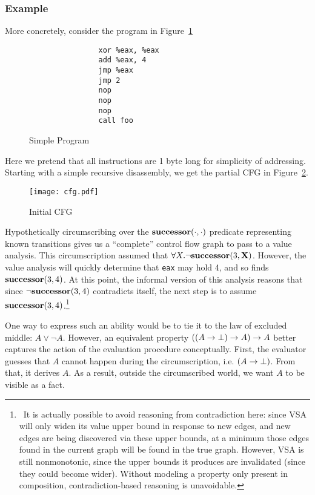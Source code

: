 \subsubsection{Example}
\label{sec:cfgexample}
More concretely, consider the program in Figure~\ref{fig:simpprog}
\begin{figure}
        \begin{lstlisting}
                xor %eax, %eax
                add %eax, 4
                jmp %eax
                jmp 2
                nop
                nop
                nop
                call foo
        \end{lstlisting}
        \caption{Simple Program}
\label{fig:simpprog}
\end{figure}
Here we pretend that all instructions are 1 byte long for simplicity of addressing.
Starting with a simple recursive disassembly, we get the partial CFG in Figure~\ref{fig:cfg0}.
\begin{figure}
        \begin{center}
                \texttt{[image: cfg.pdf]}
        \end{center}
        \caption{Initial CFG}
\label{fig:cfg0}
\end{figure}
Hypothetically circumscribing over the ${\bf successor}(\cdot, \cdot)$ predicate representing known transitions gives us a ``complete'' control flow graph to pass to a value analysis.
This circumscription assumed that $\forall{X}. \neg {\bf successor}(3, {\bf X})$.
However, the value analysis will quickly determine that \texttt{eax} may hold 4, and so finds ${\bf successor}(3, 4)$.
At this point, the informal version of this analysis reasons that since $\neg {\bf successor}(3, 4)$ contradicts itself, the next step is to assume ${\bf successor}(3, 4)$.\footnote{\
        It is actually possible to avoid reasoning from contradiction here: since VSA\cite{vsa} will only widen its value upper bound in response to new edges, and new edges are being discovered via these upper bounds, at a minimum those edges found in the current graph will be found in the true graph.
        However, VSA is still nonmonotonic, since the upper bounds it produces are invalidated (since they could become wider).
        Without modeling a property only present in composition, contradiction-based reasoning is unavoidable.
}

One way to express such an ability would be to tie it to the law of excluded middle: $A \vee \neg A$.
However, an equivalent property $((A \rightarrow \bot) \rightarrow A) \rightarrow A$ better captures the action of the evaluation procedure conceptually.
First, the evaluator guesses that $A$ cannot happen during the circumscription, i.e. $(A \rightarrow \bot)$.
From that, it derives $A$.
As a result, outside the circumscribed world, we want $A$ to be visible as a fact.

